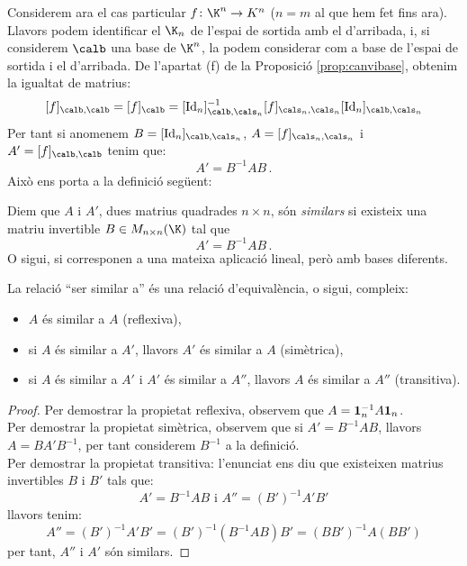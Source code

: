 Considerem ara el cas particular $f\colon \K^n \to K^n$ ($n=m$ al que hem fet fins ara). Llavors podem identificar el $\K_n$ de l'espai de sortida amb el d'arribada, i, si considerem $\calb$ una base de $\K^n$, la podem considerar com a base de l'espai de sortida i el d'arribada. De l'apartat (f) de la Proposició \ref{prop:canvibase}, obtenim la igualtat de matrius: 
$$[f]_{\calb,\calb}=[f]_\calb=[\Id_n]_{\calb,\cals_n}^{-1} [f]_{\cals_n,\cals_n} [\Id_n]_{\calb,\cals_n}$$
Per tant si anomenem $B=[\Id_n]_{\calb,\cals_n}$, $A=[f]_{\cals_n,\cals_n}$ i $A'=[f]_{\calb,\calb}$ tenim que:
$$ A'=B^{-1} A B \,.$$
Això ens porta a la definició següent:
\begin{definicio}
    Diem que $A$ i $A'$, dues matrius quadrades $n\times n$, són \emph{similars} si existeix una matriu invertible $B\in M_{n\times n}(\K)$ tal que
    $$
    A'=B^{-1}AB \,.
    $$
    O sigui, si corresponen a una mateixa aplicació lineal, però amb bases diferents.
\end{definicio}
\begin{proposicio}
    La relació ``ser similar a'' és una relació d'equivalència, o sigui, compleix:
    \begin{itemize}
        \item $A$ és similar a $A$ (reflexiva),
        \item si $A$ és similar a $A'$, llavors $A'$ és similar a $A$ (simètrica),
        \item si $A$ és similar a $A'$ i $A'$ és similar a $A''$, llavors $A$ és similar a $A''$ (transitiva).
    \end{itemize}
\end{proposicio}
\begin{proof}
    Per demostrar la propietat reflexiva, observem que $A=\mathbf{1}_n^{-1} A \mathbf{1}_n$.\\
    Per demostrar la propietat simètrica, observem que si $A'=B^{-1}AB$, llavors $A=BA'B^{-1}$, per tant considerem $B^{-1}$ a la definició.\\
    Per demostrar la propietat transitiva: l'enunciat ens diu que existeixen matrius invertibles $B$ i $B'$ tals que:
    $$
    A'=B^{-1}AB \text{ i } A''=(B')^{-1}A'B'
    $$
    llavors tenim:
    $$
    A''=(B')^{-1}A'B'=(B')^{-1}(B^{-1}AB)B'=(BB')^{-1}A(BB')
    $$
    per tant, $A''$ i $A'$ són similars.
\end{proof}
